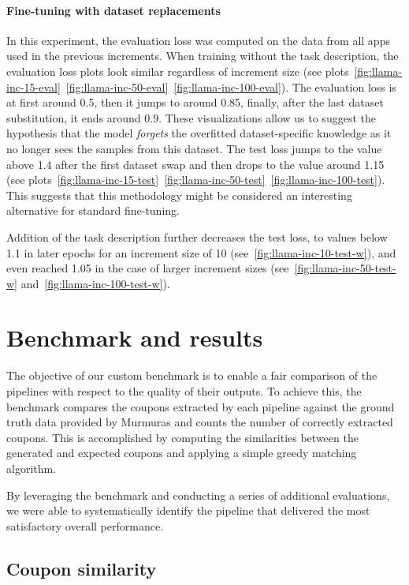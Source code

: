 \documentclass[licencjacka,en]{pracamgr}
\begin{document}
\subsubsection{Fine-tuning with dataset replacements}
In this experiment, the evaluation loss was computed on the data from all apps used in the previous increments.
When training without the task description, the evaluation loss plots look similar regardless of increment size (see plots~\ref{fig:llama-inc-15-eval}~\ref{fig:llama-inc-50-eval}~\ref{fig:llama-inc-100-eval}). The evaluation loss is at first around 0.5, then it jumps to around 0.85, finally, after the last dataset substitution, it ends around 0.9. These visualizations allow us to suggest the hypothesis that the model \emph{forgets} the overfitted dataset-specific knowledge as it no longer sees the samples from this dataset. The test loss jumps to the value above 1.4 after the first dataset swap and then drops to the value around 1.15 (see plots~\ref{fig:llama-inc-15-test}~\ref{fig:llama-inc-50-test}~\ref{fig:llama-inc-100-test}). This suggests that this methodology might be considered an interesting alternative for standard fine-tuning.

Addition of the task description further decreases the test loss, to values below 1.1 in later epochs for an increment size of 10 (see~\ref{fig:llama-inc-10-test-w}), and even reached 1.05 in the case of larger increment sizes (see~\ref{fig:llama-inc-50-test-w} and~\ref{fig:llama-inc-100-test-w}).

\chapter{Benchmark and results} \label{chap:benchmark}

The objective of our custom benchmark is to enable a fair comparison of the pipelines with respect to the quality of their outputs. To achieve this, the benchmark compares the coupons extracted by each pipeline against the ground truth data provided by Murmuras and counts the number of correctly extracted coupons. This is accomplished by computing the similarities between the generated and expected coupons and applying a simple greedy matching algorithm.

By leveraging the benchmark and conducting a series of additional evaluations, we were able to systematically identify the pipeline that delivered the most satisfactory overall performance.

\section{Coupon similarity}
\end{document}
